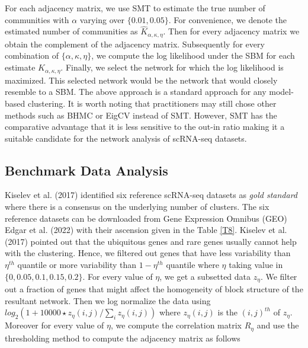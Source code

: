 \documentclass[11pt]{article}
\begin{document}
For each adjacency matrix, we use SMT to estimate the true number of communities with $\alpha$ varying over $\{0.01, 0.05\}$. For convenience, we denote the estimated number of communities as $\hat{K}_{\alpha, \kappa, \eta}$. Then for every adjacency matrix we obtain the complement of the adjacency matrix. Subsequently for every combination of $\{\alpha, \kappa, \eta \}$, we compute the log likelihood under the SBM for each estimate $\hat{K}_{\alpha, \kappa, \eta}$. Finally, we select the network for which the log likelihood is maximized. This selected network would be the network that would closely resemble to a SBM.
The above approach is a standard approach for any model-based clustering. It is worth noting that practitioners may still chose other methods such as BHMC or EigCV instead of SMT. However, SMT has the comparative advantage that it is less sensitive to the out-in ratio making it a suitable candidate for the network analysis of scRNA-seq datasets.


\subsection{Benchmark Data Analysis} Kiselev et al. (2017) \cite{kiselev2017} identified six reference scRNA-seq datasets as \emph{gold standard} where there is a consensus on the underlying number of clusters. The six reference datasets can be downloaded from Gene Expression Omnibus (GEO) Edgar et al. (2022) \cite{edgar2002} with their ascension given in the Table \ref{T8}. Kiselev et al. (2017) \cite{kiselev2017}
pointed out that the ubiquitous genes and rare genes usually cannot help with the clustering. Hence, we filtered out genes that have less variability than $\eta^{th}$ quantile or more variability than $1 - \eta^{th}$ quantile where $\eta$ taking value in $\{0, 0.05, 0.1, 0.15, 0.2\}$. For every value of $\eta$, we get a subsetted data $z_{\eta}$. We filter out a fraction of genes that might affect the homogeneity of block structure of the resultant network. Then we log normalize the data using $log_2(1 + 10000 \star z_{\eta}(i,j)/\sum_i z_{\eta}(i,j) )$ where $z_{\eta}(i,j)$ is the $(i,j)^{th}$ of $z_{\eta}$. Moreover for every value of $\eta$, we compute the correlation matrix $R_{\eta}$ and use the thresholding method to compute the adjacency matrix as follows
\end{document}
